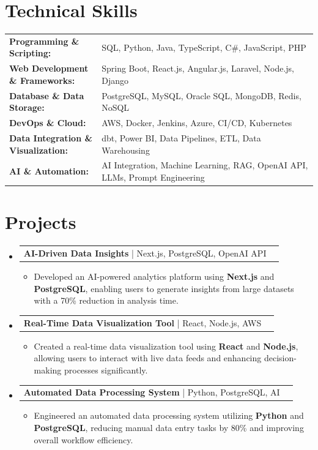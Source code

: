 \documentclass[letterpaper,10pt]{article}
\makeatletter
\newcommand{\resumeItem}[1]{
  \item{\fontsize{8pt}{9pt}\selectfont
    #1 \vspace{-3pt}
  }
}
\newcommand{\resumeProjectHeading}[2]{
    \item
    \begin{tabular*}{1.001\textwidth}{l@{\extracolsep{\fill}}r}
      \fontsize{8.5pt}{10pt}#1 & \textbf{\fontsize{8.5pt}{10pt} #2}\\
    \end{tabular*}\vspace{-7pt}
}
\newcommand{\resumeSubHeadingListStart}{\begin{itemize}[leftmargin=0pt, label={}]}
\newcommand{\resumeSubHeadingListEnd}{\end{itemize}}
\newcommand{\resumeItemListStart}{\begin{itemize}[leftmargin=*]}
\newcommand{\resumeItemListEnd}{\end{itemize}\vspace{-5pt}}
\makeatother
\begin{document}
\section{Technical Skills}
        \vspace{-14pt}
        \begin{table}[h]
            \fontsize{8pt}{9pt}\selectfont
            \begin{tabular}{p{0.3\linewidth} p{0.7\linewidth}}
                \textbf{Programming \& Scripting:} & SQL, Python, Java, TypeScript, C\#, JavaScript, PHP \\
                \textbf{Web Development \& Frameworks:} & Spring Boot, React.js, Angular.js, Laravel, Node.js, Django \\
                \textbf{Database \& Data Storage:} & PostgreSQL, MySQL, Oracle SQL, MongoDB, Redis, NoSQL \\
                \textbf{DevOps \& Cloud:} & AWS, Docker, Jenkins, Azure, CI/CD, Kubernetes \\
                \textbf{Data Integration \& Visualization:} & dbt, Power BI, Data Pipelines, ETL, Data Warehousing \\
                \textbf{AI \& Automation:} & AI Integration, Machine Learning, RAG, OpenAI API, LLMs, Prompt Engineering \\
            \end{tabular}
        \end{table}
 \vspace{-18pt}

\section{Projects}
    \vspace{-5pt}
    \resumeSubHeadingListStart
          \resumeProjectHeading
            {\textbf{AI-Driven Data Insights} | Next.js, PostgreSQL, OpenAI API}{}
            \resumeItemListStart
                \resumeItem{Developed an AI-powered analytics platform using \textbf{Next.js} and \textbf{PostgreSQL}, enabling users to generate insights from large datasets with a 70\% reduction in analysis time.}
            \resumeItemListEnd
        \vspace{-12pt}
    
        \resumeProjectHeading
            {\textbf{Real-Time Data Visualization Tool} | React, Node.js, AWS}{}
        \resumeItemListStart
                \resumeItem{Created a real-time data visualization tool using \textbf{React} and \textbf{Node.js}, allowing users to interact with live data feeds and enhancing decision-making processes significantly.}
        \resumeItemListEnd
      \vspace{-12pt}
      \resumeProjectHeading
        {\textbf{Automated Data Processing System} | Python, PostgreSQL, AI}{}
    \resumeItemListStart
            \resumeItem{Engineered an automated data processing system utilizing \textbf{Python} and \textbf{PostgreSQL}, reducing manual data entry tasks by 80\% and improving overall workflow efficiency.}
    \resumeItemListEnd
    \resumeSubHeadingListEnd
\end{document}
